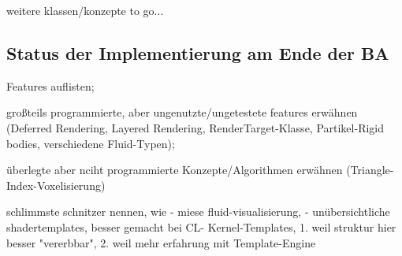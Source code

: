 weitere klassen/konzepte to go...	


\subsection{Status der Implementierung am Ende der BA}
	
	Features auflisten;

	großteils programmierte, aber ungenutzte/ungetestete features erwähnen (Deferred Rendering, Layered Rendering, 	
	RenderTarget-Klasse, Partikel-Rigid bodies, verschiedene Fluid-Typen); 


	überlegte aber nciht programmierte Konzepte/Algorithmen erwähnen (Triangle-Index-Voxelisierung)
	
	schlimmste schnitzer nennen, wie
		- miese fluid-visualisierung, 
		- unübersichtliche shadertemplates, besser gemacht bei CL-
			Kernel-Templates, 1. weil struktur hier besser "vererbbar", 2. weil mehr erfahrung mit  Template-Engine
	
	  	
  	

\clearpage
